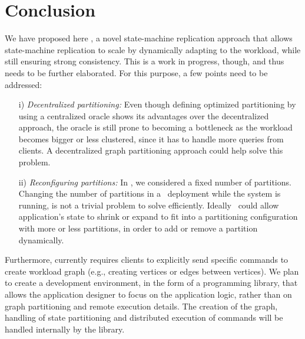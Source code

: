 \chapter[Conclusion]{Conclusion}


We have proposed here \dynastar, a novel state-machine replication approach that
allows state-machine replication to scale by dynamically adapting to the
workload, while still ensuring strong consistency. This is a work in progress,
though, and thus needs to be further elaborated. For this purpose, a few points
need to be addressed:

\begin{itemize}

    \item[i)]\emph{Decentralized partitioning:}
    Even though defining optimized partitioning by using a centralized oracle
    shows its advantages over the decentralized approach, the oracle is still
    prone to becoming a bottleneck as the workload becomes bigger or less
    clustered, since it has to handle more queries from clients. A decentralized
    graph partitioning approach could help solve this problem.

    \item[ii)]\emph{Reconfiguring partitions:}
    In \dynastar, we considered a fixed number of partitions. Changing the
    number of partitions in a \dynastar\ deployment while the system is running,
    is not a trivial problem to solve efficiently. Ideally \dynastar\ could
    allow application's state to shrink or expand to fit into a partitioning
    configuration with more or less partitions, in order to add or remove a
    partition dynamically.

\end{itemize}

Furthermore, \dynastar currently requires clients to explicitly send specific
commands to create workload graph (e.g., creating vertices or edges between
vertices). We plan to create a development environment, in the form of a
programming library, that allows the application designer to focus on the
application logic, rather than on graph partitioning and remote execution
details. The creation of the graph, handling of state partitioning and
distributed execution of commands will be handled internally by the library.
